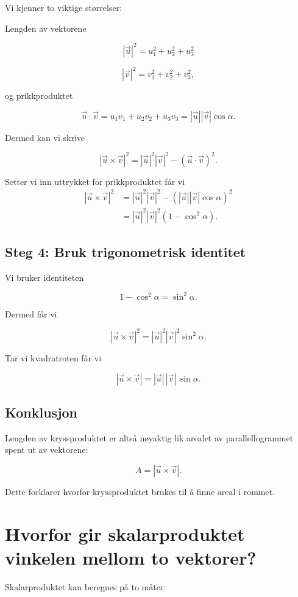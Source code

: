 \documentclass[a4paper,12pt]{article}
\begin{document}
Vi kjenner to viktige størrelser:

Lengden av vektorene

\[
|\vec u|^2 = u_1^2+u_2^2+u_3^2
\]

\[
|\vec v|^2 = v_1^2+v_2^2+v_3^2,
\]

og prikkproduktet

\[
\vec u\cdot\vec v
=
u_1v_1+u_2v_2+u_3v_3
=
|\vec u||\vec v|\cos\alpha.
\]

Dermed kan vi skrive

\[
|\vec u \times \vec v|^2
=
|\vec u|^2 |\vec v|^2
-
(\vec u\cdot\vec v)^2.
\]

Setter vi inn uttrykket for prikkproduktet får vi
\begin{align*}
|\vec u \times \vec v|^2 
&= |\vec u|^2 |\vec v|^2 - (|\vec u||\vec v|\cos\alpha)^2 \\
&= |\vec u|^2 |\vec v|^2 (1-\cos^2\alpha).
\end{align*}

\subsection*{Steg 4: Bruk trigonometrisk identitet}

Vi bruker identiteten

\[
1-\cos^2\alpha = \sin^2\alpha.
\]

Dermed får vi

\[
|\vec u \times \vec v|^2
=
|\vec u|^2 |\vec v|^2 \sin^2\alpha.
\]

Tar vi kvadratroten får vi

\[
|\vec u \times \vec v|
=
|\vec u|\,|\vec v|\,\sin\alpha. \tag*{\qed}
\]

\subsection*{Konklusjon}

Lengden av kryssproduktet er altså nøyaktig lik arealet av parallellogrammet spent ut av vektorene:

\[
A = |\vec u \times \vec v|.
\]

Dette forklarer hvorfor kryssproduktet brukes til å finne areal i rommet.
\newpage
\section{Hvorfor gir skalarproduktet vinkelen mellom to vektorer?}

Skalarproduktet kan beregnes på to måter:
\end{document}

